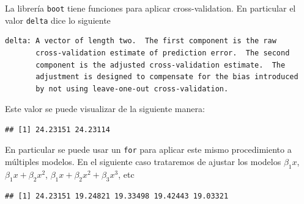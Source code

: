 \documentclass[
  12pt,
]{book}
\newenvironment{Shaded}{\begin{snugshade}}{\end{snugshade}}
\newcommand{\AttributeTok}[1]{\textcolor[rgb]{0.77,0.63,0.00}{#1}}
\newcommand{\ControlFlowTok}[1]{\textcolor[rgb]{0.13,0.29,0.53}{\textbf{#1}}}
\newcommand{\DecValTok}[1]{\textcolor[rgb]{0.00,0.00,0.81}{#1}}
\newcommand{\FunctionTok}[1]{\textcolor[rgb]{0.00,0.00,0.00}{#1}}
\newcommand{\NormalTok}[1]{#1}
\newcommand{\OtherTok}[1]{\textcolor[rgb]{0.56,0.35,0.01}{#1}}
\newcommand{\SpecialCharTok}[1]{\textcolor[rgb]{0.00,0.00,0.00}{#1}}
\begin{document}
La librería \texttt{boot} tiene funciones para aplicar cross-validation.
En particular el valor \texttt{delta} dice lo siguiente

\begin{verbatim}
delta: A vector of length two.  The first component is the raw
       cross-validation estimate of prediction error.  The second
       component is the adjusted cross-validation estimate.  The
       adjustment is designed to compensate for the bias introduced
       by not using leave-one-out cross-validation.
\end{verbatim}

Este valor se puede visualizar de la siguiente manera:

\begin{Shaded}
\end{Shaded}

\begin{verbatim}
## [1] 24.23151 24.23114
\end{verbatim}

En particular se puede usar un \texttt{for} para aplicar este mismo
procedimiento a múltiples modelos. En el siguiente caso trataremos de
ajustar los modelos \(\beta_1 x\), \(\beta_1 x + \beta_2 x^2\),
\(\beta_1 x + \beta_2 x^2 +\beta_3 x^{3}\), etc

\begin{Shaded}
\end{Shaded}

\begin{verbatim}
## [1] 24.23151 19.24821 19.33498 19.42443 19.03321
\end{verbatim}
\end{document}
